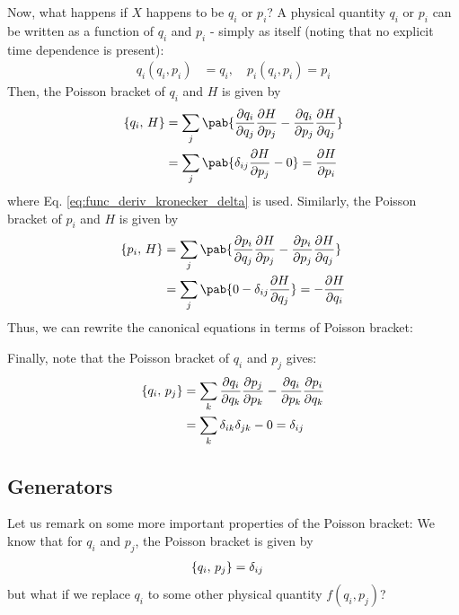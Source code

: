 Now, what happens if $X$ happens to be $q_i$ or $p_i$?
A physical quantity $q_i$ or $p_i$ can be written as a function of $q_i$ and $p_i$ - simply as itself (noting that no explicit time dependence is present):
\begin{align}
  q_i(q_i, p_i) & = q_i, \quad p_i(q_i, p_i) = p_i
\end{align}
Then, the Poisson bracket of $q_i$ and $H$ is given by
\begin{align}
  \pobra{q_i}{H} & = \sum_j \pab{\pdv{q_i}{q_j} \pdv{H}{p_j} - \pdv{q_i}{p_j} \pdv{H}{q_j}} \\
                 & = \sum_j \pab{\delta_{ij} \pdv{H}{p_j} - 0} = \pdv{H}{p_i}
\end{align}
where Eq. \eqref{eq:func_deriv_kronecker_delta} is used.
Similarly, the Poisson bracket of $p_i$ and $H$ is given by
\begin{align}
  \pobra{p_i}{H} & = \sum_j \pab{\pdv{p_i}{q_j} \pdv{H}{p_j} - \pdv{p_i}{p_j} \pdv{H}{q_j}} \\
                 & = \sum_j \pab{0 - \delta_{ij} \pdv{H}{q_j}} = - \pdv{H}{q_i}
\end{align}
Thus, we can rewrite the canonical equations in terms of Poisson bracket:

Finally, note that the Poisson bracket of $q_i$ and $p_j$ gives:
\begin{align}
  \left\lbrace q_i ,\, p_j \right\rbrace & = \sum_k \pdv{q_i}{q_k} \pdv{p_j}{p_k} - \pdv{q_i}{p_k} \pdv{p_i}{q_k} \\
                   & = \sum_k \delta_{ik} \delta_{jk} - 0 = \delta_{ij}
\end{align}

\subsection{Generators}
Let us remark on some more important properties of the Poisson bracket:
We know that for $q_i$ and $p_j$, the Poisson bracket is given by
\begin{align}
  \left\lbrace q_i ,\, p_j \right\rbrace & = \delta_{ij}
\end{align}
but what if we replace $q_i$ to some other physical quantity $f(q_i, p_j)$?

